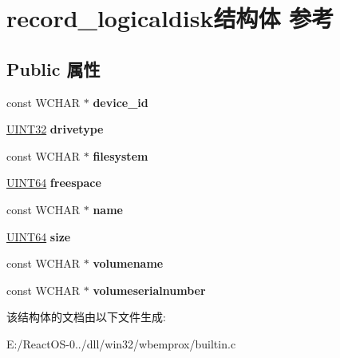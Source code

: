 \hypertarget{structrecord__logicaldisk}{}\section{record\+\_\+logicaldisk结构体 参考}
\label{structrecord__logicaldisk}
\subsection*{Public 属性}
\begin{DoxyCompactItemize}
\item 
\mbox{\label{structrecord__logicaldisk_ab5a774799e8298be5b22d38f1d50fbf5}} 
const W\+C\+H\+AR $\ast$ {\bfseries device\+\_\+id}
\item 
\mbox{\label{structrecord__logicaldisk_a04584c694bc38d5399520f8bef29c851}} 
\hyperlink{_processor_bind_8h_ae1e6edbbc26d6fbc71a90190d0266018}{U\+I\+N\+T32} {\bfseries drivetype}
\item 
\mbox{\label{structrecord__logicaldisk_a95277a65c764a40fc2f54c1aa45f2f6d}} 
const W\+C\+H\+AR $\ast$ {\bfseries filesystem}
\item 
\mbox{\label{structrecord__logicaldisk_a696913800fc36b73b02e59b2d390c84c}} 
\hyperlink{_processor_bind_8h_a57be03562867144161c1bfee95ca8f7c}{U\+I\+N\+T64} {\bfseries freespace}
\item 
\mbox{\label{structrecord__logicaldisk_aea3b522456d11b4bdc57eaa79eb81a29}} 
const W\+C\+H\+AR $\ast$ {\bfseries name}
\item 
\mbox{\label{structrecord__logicaldisk_a3c67415a0907950ac3c3f86fb4e54dc4}} 
\hyperlink{_processor_bind_8h_a57be03562867144161c1bfee95ca8f7c}{U\+I\+N\+T64} {\bfseries size}
\item 
\mbox{\label{structrecord__logicaldisk_a84a86bcf60326fb8342abcfa9216b60f}} 
const W\+C\+H\+AR $\ast$ {\bfseries volumename}
\item 
\mbox{\label{structrecord__logicaldisk_a6ccf680a43492d9995bb2e76710f8177}} 
const W\+C\+H\+AR $\ast$ {\bfseries volumeserialnumber}
\end{DoxyCompactItemize}


该结构体的文档由以下文件生成\+:\begin{DoxyCompactItemize}
\item 
E\+:/\+React\+O\+S-\/0../dll/win32/wbemprox/builtin.\+c\end{DoxyCompactItemize}
